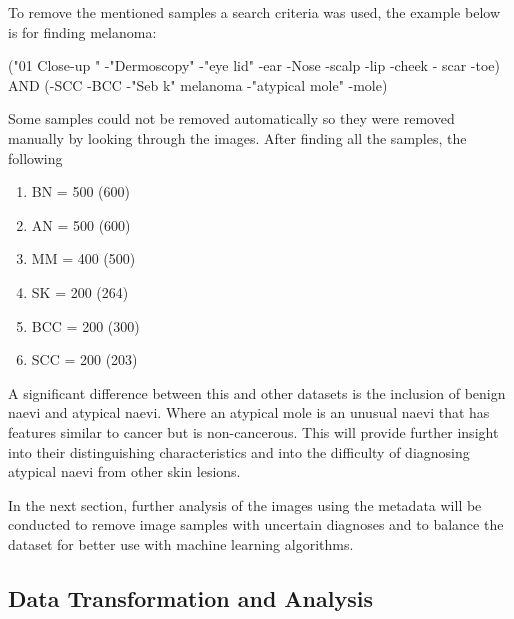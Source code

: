To remove the mentioned samples a search criteria was used, the example below is for finding melanoma:

\begin{center}
("01 Close-up " -"Dermoscopy" -"eye lid" -ear -Nose -scalp -lip -cheek - scar -toe) AND (-SCC -BCC -"Seb k" melanoma -"atypical mole" -mole)
\end{center}

Some samples could not be removed automatically so they were removed manually by looking through the images. After finding all the samples, the following

\begin{enumerate}
\item BN = 500 (600)
\item AN = 500 (600)
\item MM = 400 (500)
\item SK = 200 (264)
\item BCC = 200 (300)
\item SCC = 200 (203)
\end{enumerate}

A significant difference between this and other datasets is the inclusion of benign naevi and atypical naevi. Where an atypical mole is an unusual naevi that has features similar to cancer but is non-cancerous. This will provide further insight into their distinguishing characteristics and into the difficulty of diagnosing atypical naevi from other skin lesions.

In the next section, further analysis of the images using the metadata will be conducted to remove image samples with uncertain diagnoses and to balance the dataset for better use with machine learning algorithms.

\subsection{Data Transformation and Analysis}

